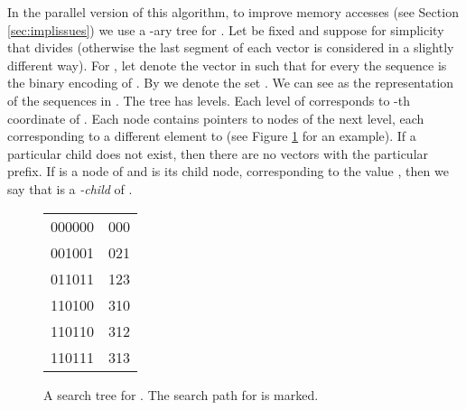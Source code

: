 \documentclass[a4paper]{article}
\begin{document}
In the parallel version of this algorithm, to improve memory accesses (see Section \ref{sec:implissues}) we use a -ary tree  for . Let  be fixed and suppose for simplicity that  divides  (otherwise the last segment of each vector is considered in a slightly different way).
For , let  denote the vector in  such that for every  the sequence
 is the binary encoding of . By  we denote the set . We can see  as the representation of the sequences in  . 
The tree  has  levels. Each level of  corresponds to -th coordinate of .
Each node contains  pointers to nodes of the next level, each corresponding to a different element to  (see Figure \ref{fig:r-tree} for an example).
If a particular child does not exist, then there are no vectors with the particular prefix. If  is a node of  and  is its child node, corresponding to the value , then we say that  is a {\em -child} of .
\begin{figure}[ht]
\centering
\begin{center}
\raisebox{-30pt}
{
\tiny
{}
}
\small
\hskip 1cm
\begin{tabular}{l|l}
 &  \\ \hline
000000 & 000 \\
001001 & 021 \\
011011 & 123 \\
110100 & 310 \\
110110 & 312 \\
110111 & 313 
\end{tabular}
\end{center}
\caption{A search tree for . The search path for  is marked.} 
\label{fig:r-tree}
\end{figure}
\end{document}
